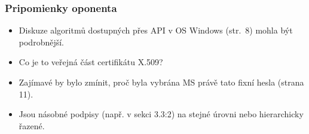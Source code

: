 \documentclass[xcolor=dvipsnames]{beamer}
\begin{document}


\begin{frame}
	\frametitle{Pripomienky oponenta}
	\begin{itemize}
		\item Diskuze algoritmů dostupných přes API v OS Windows (str.~8) mohla být podrobnější.
		\item Co je to veřejná část certifikátu X.509?
		\item Zajímavé by bylo zmínit, proč byla vybrána MS právě tato fixní hesla (strana 11).
		\item Jsou násobné podpisy (např. v sekci 3.3:2) na stejné úrovni nebo hierarchicky řazené. 
	\end{itemize}

\end{frame}
\end{document}
